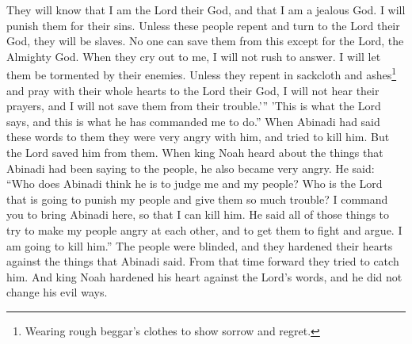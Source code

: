 They will know that I am the Lord their God, and that I am a jealous God. I will punish them for their sins.
\bverse \iffalse And it shall come to pass that except this people repent and turn unto the Lord their God, they shall be brought into bondage; and none shall deliver them, except it be the Lord the Almighty God. \fi
Unless these people repent and turn to the Lord their God, they will be slaves. No one can save them from this except for the Lord, the Almighty God.
\bverse \iffalse Yea, and it shall come to pass that when they shall cry unto me I will be slow to hear their cries; yea, and I will suffer them that they be smitten by their enemies. \fi
When they cry out to me, I will not rush to answer. I will let them be tormented by their enemies.
\bverse \iffalse And except they repent in sackcloth and ashes, and cry mightily to the Lord their God, I will not hear their prayers, neither will I deliver them out of their afflictions; and thus saith the Lord, and thus hath he commanded me. \fi
Unless they repent in sackcloth and ashes\footnote{Wearing rough beggar's clothes to show sorrow and regret.} and pray with their whole hearts to the Lord their God, I will not hear their prayers, and I will not save them from their trouble.\rq '' \rq This is what the Lord says, and this is what he has commanded me to do.''
\bverse \iffalse Now it came to pass that when Abinadi had spoken these words unto them they were wroth with him, and sought to take away his life; but the Lord delivered him out of their hands. \fi
When Abinadi had said these words to them they were very angry with him, and tried to kill him. But the Lord saved him from them.
\bverse \iffalse Now when king Noah had heard of the words which Abinadi had spoken unto the people, he was also wroth; and he said: Who is Abinadi, that I and my people should be judged of him, or who is the Lord, that shall bring upon my people such great affliction? \fi
When king Noah heard about the things that Abinadi had been saying to the people, he also became very angry. He said: ``Who does Abinadi think he is to judge me and my people? Who is the Lord that is going to punish my people and give them so much trouble?
\bverse \iffalse I command you to bring Abinadi hither, that I may slay him, for he has said these things that he might stir up my people to anger one with another, and to raise contentions among my people; therefore I will slay him. \fi
I command you to bring Abinadi here, so that I can kill him. He said all of those things to try to make my people angry at each other, and to get them to fight and argue. I am going to kill him.''
\bverse \iffalse Now the eyes of the people were blinded; therefore they hardened their hearts against the words of Abinadi, and they sought from that time forward to take him. And king Noah hardened his heart against the word of the Lord, and he did not repent of his evil doings. \fi
The people were blinded, and they hardened their hearts against the things that Abinadi said. From that time forward they tried to catch him. And king Noah hardened his heart against the Lord's words, and he did not change his evil ways.

